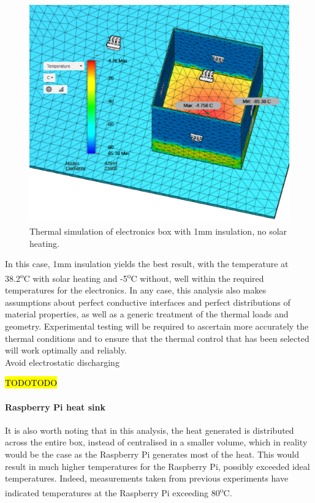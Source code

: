 	\begin{figure}[h!]
    \centering  
    \includegraphics[scale=0.65]{4-experiment-design/img/mechanical/1mmthicknoheat.PNG}
	\caption{Thermal simulation of electronics box with 1mm insulation, no solar heating.}
	\label{fig:1mmthicknoheat}    
    	\end{figure}
	
In this case, 1mm insulation yields the best result, with the temperature at 38.2\textsuperscript{o}C with solar heating and -5\textsuperscript{o}C without, well within the required temperatures for the electronics. In any case, this analysis also makes assumptions about perfect conductive interfaces and perfect distributions of material properties, as well as a generic treatment of the thermal loads and geometry. Experimental testing will be required to ascertain more accurately the thermal conditions and to ensure that the thermal control that has been selected will work optimally and reliably. \\

Avoid electrostatic discharging 

\hl{TODOTODO}




\paragraph{Raspberry Pi heat sink}

It is also worth noting that in this analysis, the heat generated is distributed across the entire box, instead of centralised in a smaller volume, which in reality would be the case as the Raspberry Pi generates most of the heat. This would result in much higher temperatures for the Raspberry Pi, possibly exceeded ideal temperatures. Indeed, measurements taken from previous experiments have indicated temperatures at the Raspberry Pi exceeding 80\textsuperscript{o}C. \\

